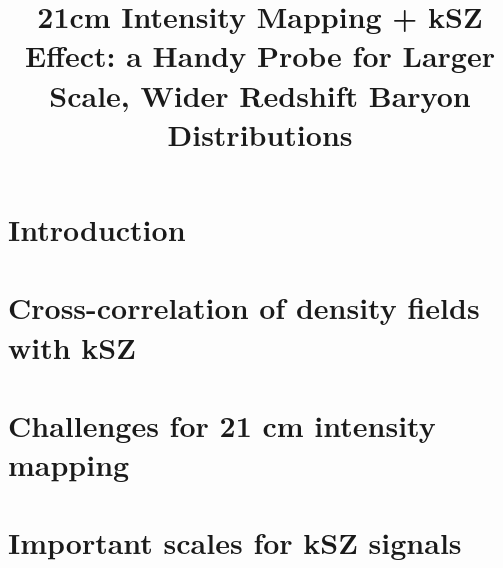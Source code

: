 \documentclass[aps,prd,twocolumn,showpacs,superscriptaddress,groupedaddress,nofootinbib]{revtex4}  %
\begin{document}
\widetext

\title{21cm Intensity Mapping + kSZ Effect: 
a Handy Probe for Larger Scale, Wider Redshift Baryon Distributions}


\pacs{}
\maketitle

\section{Introduction}

\section{Cross-correlation of density fields with kSZ}

\section{Challenges for 21 cm intensity mapping}

\section{Important scales for kSZ signals}

%
%
\end{document}
